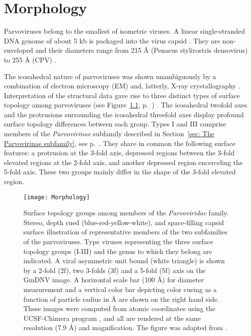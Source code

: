 
\chapter{Morphology} %

\label{Chapter3} %



\label{sec:Morphology}

Parvoviruses belong to the smallest of isometric viruses. A linear single-stranded DNA genome of about 5 kb is packaged into the virus capsid \cite{pmid4975639, pmid5264145, pmid5429749}. They are non-enveloped and their diameters range from 215 \r{A} (Penaeus stylirostris densovirus) to 255 \r{A} (CPV) \cite{pmid10497831, icvt}. 

The icosahedral nature of parvoviruses was shown unambiguously by a combination of electron microscopy (EM) and, latterly, X-ray crystallography \cite{pmid2006420}. Interpretation of the structural data gave rise to three distinct types of surface topology among parvoviruses (see Figure~\ref{Morphology}, p.~\pageref{Morphology}) \cite{pmid15795290}. The icosahedral twofold axes and the protrusions surrounding the icosahedral threefold axes display profound surface topology differences between each group. Types I and III comprise members of the \textit{Parvovirinae} subfamily described in Section~\ref{sec: The Parvovirinae subfamily}, see p.~\pageref{sec: The Parvovirinae subfamily}. They share in common the following surface features: a protrusion at the 3-fold axis, depressed regions between the 3-fold elevated regions at the 2-fold axis, and another depressed region encerceling the 5-fold axis. These two groups mainly differ in the shape of the 3-fold elevated region. 

\bigskip
\begin{figure}[H] 
\centering
\texttt{[image: Morphology]}
\caption[Parvovirus surface topology groups]{Surface topology groups among members of the \textit{Parvoviridae} family. Stereo, depth cued (blue-red-yellow-white), and space-filling capsid surface illustration of representative members of the two subfamilies of the parvoviruses. Type viruses representing the three surface topology groups (I-III) and the genus to which they belong are indicated. A viral asymmetric unit bound (white triangle) is shown by a 2-fold (2f), two 3-folds (3f) and a 5-fold (5f) axis on the GmDNV image. A horizontal scale bar (100 \r{A}) for diameter measurement and a vertical color bar depicting color cueing as a function of particle radius in \r{A} are shown on the right hand side. These images were computed from atomic coordinates using the UCSF-Chimera program \cite{pmid15264254}, and all are rendered at the same resolution (7.9 \r{A}) and magnification. The figure was adapted from \cite{pmid20375175}.}
\label{Morphology}
\end{figure}

